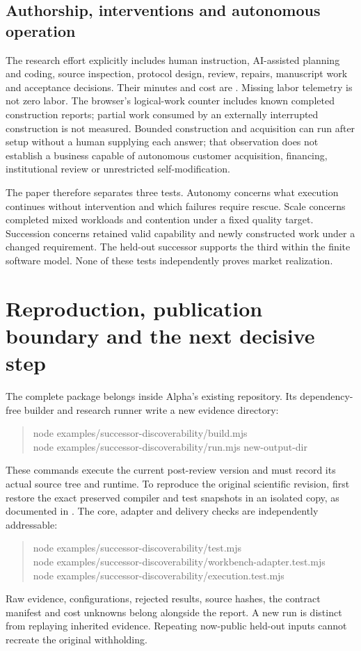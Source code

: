 \documentclass[11pt,letterpaper]{article}
\theoremstyle{definition}\newtheorem{definition}[theorem]{Definition}
\theoremstyle{remark}\newtheorem{remark}[theorem]{Remark}
\begin{document}
\subsection{Authorship, interventions and autonomous operation}
The research effort explicitly includes human instruction, AI-assisted planning and coding, source inspection, protocol design, review, repairs, manuscript work and acceptance decisions. Their minutes and cost are \HumanMinutesStatus. Missing labor telemetry is not zero labor. The browser's logical-work counter includes known completed construction reports; partial work consumed by an externally interrupted construction is not measured. Bounded construction and acquisition can run after setup without a human supplying each answer; that observation does not establish a business capable of autonomous customer acquisition, financing, institutional review or unrestricted self-modification.

The paper therefore separates three tests. Autonomy concerns what execution continues without intervention and which failures require rescue. Scale concerns completed mixed workloads and contention under a fixed quality target. Succession concerns retained valid capability and newly constructed work under a changed requirement. The held-out successor supports the third within the finite software model. None of these tests independently proves market realization.



\section{Reproduction, publication boundary and the next decisive step}
\label{sec:reproduce}
The complete package belongs inside Alpha's existing repository. Its dependency-free builder and research runner write a new evidence directory:
\begin{quote}\small\ttfamily
node examples/successor-discoverability/build.mjs\\
node examples/successor-discoverability/run.mjs new-output-dir
\end{quote}
These commands execute the current post-review version and must record its actual source tree and runtime. To reproduce the original scientific revision, first restore the exact preserved compiler and test snapshots in an isolated copy, as documented in . The core, adapter and delivery checks are independently addressable:
\begin{quote}\small\ttfamily
node examples/successor-discoverability/test.mjs\\
node examples/successor-discoverability/workbench-adapter.test.mjs\\
node examples/successor-discoverability/execution.test.mjs
\end{quote}
\ReproductionStatus{}
Raw evidence, configurations, rejected results, source hashes, the contract manifest and cost unknowns belong alongside the report. A new run is distinct from replaying inherited evidence. Repeating now-public held-out inputs cannot recreate the original withholding.
\end{document}
